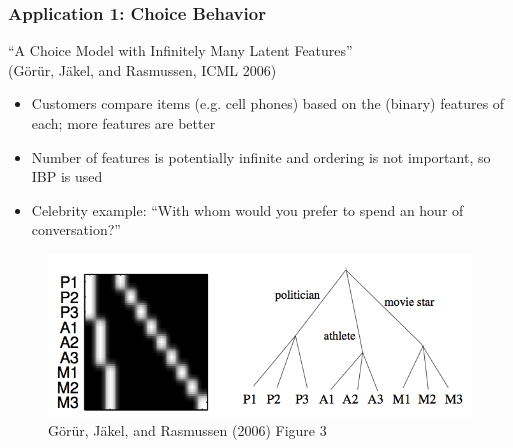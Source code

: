 \documentclass[13pt]{beamer}
\begin{document}
\begin{frame}
\frametitle{Application 1: Choice Behavior}

\begin{center}
``A Choice Model with Infinitely Many Latent Features'' \\ (G\"{o}r\"{u}r, J\"{a}kel, and Rasmussen, ICML 2006)
\end{center}

\begin{itemize}
\item Customers compare items (e.g. cell phones) based on the (binary) features of each; more features are better
\item Number of features is potentially infinite and ordering is not important, so IBP is used
\item Celebrity example: ``With whom would you prefer to spend an hour of conversation?'' 
\end{itemize}


\begin{figure}
\begin{center}
\includegraphics[scale=0.3]{./img/celebrity-example.png}
\caption{G\"{o}r\"{u}r, J\"{a}kel, and Rasmussen (2006) Figure 3}
\end{center}
\end{figure}

\end{frame}
\end{document}
